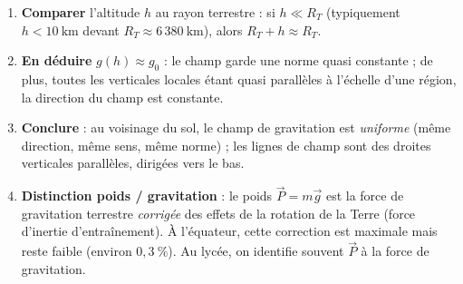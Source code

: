 \documentclass[11pt]{article}
\newcommand{\cle}[1]{{\popxbold\color{popdark}#1}}
\begin{document}
\begin{methode}
\begin{enumerate}
\item \textbf{Comparer} l'altitude $h$ au rayon terrestre : si $h \ll R_T$ (typiquement $h < 10\ \mathrm{km}$ devant $R_T \approx 6\,380\ \mathrm{km}$), alors $R_T + h \approx R_T$.
\item \textbf{En déduire} $g(h) \approx g_0$ : le champ garde une norme quasi constante ; de plus, toutes les verticales locales étant quasi parallèles à l'échelle d'une région, la direction du champ est constante.
\item \textbf{Conclure} : au voisinage du sol, le champ de gravitation est \emph{uniforme} (même direction, même sens, même norme) ; les lignes de champ sont des droites verticales parallèles, dirigées vers le bas.
\item \textbf{Distinction poids / gravitation} : le \cle{poids} $\vec{P} = m\vec{g}$ est la force de gravitation terrestre \emph{corrigée} des effets de la rotation de la Terre (force d'inertie d'entraînement). À l'équateur, cette correction est maximale mais reste faible (environ $0,3\ \%$). Au lycée, on identifie souvent $\vec{P}$ à la force de gravitation.
\end{enumerate}
\end{methode}
\end{document}

